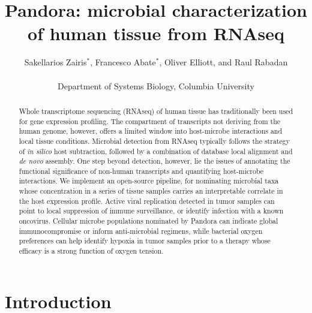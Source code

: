 \documentclass[twocolumn,11pt]{article}
\begin{document}
\title{Pandora: microbial characterization of human tissue from RNAseq}

\author{Sakellarios Zairis$^*$, Francesco Abate$^*$, Oliver Elliott, and Raul Rabadan\\
\\
Department of Systems Biology, Columbia University}
\maketitle



\begin{abstract}

Whole transcriptome sequencing (RNAseq) of human tissue has traditionally been used for gene expression profiling.
The compartment of transcripts not deriving from the human genome, however, offers a limited window into host-microbe interactions and local tissue conditions.
Microbial detection from RNAseq typically follows the strategy of \textit{in silico} host subtraction, followed by a combination of database local alignment and \textit{de novo} assembly.
One step beyond detection, however, lie the issues of annotating the functional significance of non-human transcripts and quantifying host-microbe interactions.
We implement an open-source pipeline, for nominating microbial taxa whose concentration in a series of tissue samples carries an interpretable correlate in the host expression profile.
Active viral replication detected in tumor samples can point to local suppression of immune surveillance, or identify infection with a known oncovirus.
Cellular microbe populations nominated by Pandora can indicate global immunocompromise or inform anti-microbial regimens, while bacterial oxygen preferences can help identify hypoxia in tumor samples prior to a therapy whose efficacy is a strong function of oxygen tension. 

\end{abstract}


\section{Introduction}
\end{document}
